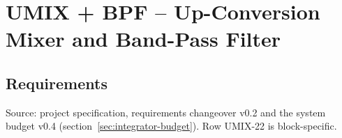 
\chapter{UMIX + BPF -- Up-Conversion Mixer and Band-Pass Filter}
\label{ch:umix}


\section{Requirements}
Source: project specification, requirements changeover v0.2 and the system budget v0.4
(section~\ref{sec:integrator-budget}). Row UMIX-22 is block-specific.

